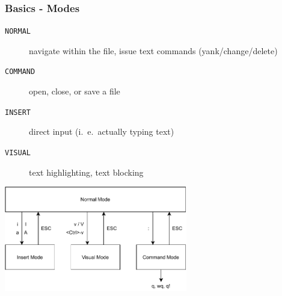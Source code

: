 \documentclass{beamer}
\begin{document}
\begin{frame}
    \frametitle{Basics - Modes}
    \begin{description}
        \item [\texttt{NORMAL}]  navigate within the file, issue text commands (yank/change/delete)
        \item [\texttt{COMMAND}] open, close, or save a file
        \item [\texttt{INSERT}]  direct input (i.\ e.\ actually typing text)
        \item [\texttt{VISUAL}]  text highlighting, text blocking
    \end{description}
    \vspace{0.5cm}
    \begin{center}
        \includegraphics[width=0.6\textwidth]{graphics/vim_modes.pdf}
    \end{center}
\end{frame}
\end{document}
